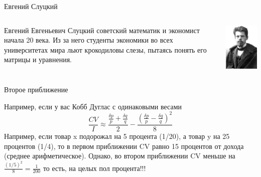 \documentclass{beamer}
\begin{document}
\begin{frame}{Евгений Слуцкий}
\begin{columns}
\begin{column}{0.5\textwidth}
   \alert{Евгений Евгеньевич Слуцкий} советский математик и экономист начала 20 века. Из за него студенты экономики во всех университетах мира льют крокодиловы слезы, пытаясь понять его матрицы и уравнения.
\end{column}
\begin{column}{0.5\textwidth}  %
    \begin{center}
     \includegraphics[width=1\textwidth]{eugen}
     \end{center}
\end{column}
\end{columns}
\end{frame}

\begin{frame}{Второе приближение}

Например, если у вас Кобб Дуглас с одинаковыми весами
$$ \frac{CV}{I} \approx \frac{\frac{\delta p}{p}+\frac{\delta q}{q}}{2} - \frac{(\frac{\delta p}{p}-\frac{\delta q}{q})^2}{8}$$
Например, если товар x подорожал на 5 процента (1/20), а товар y на 25 процентов (1/4), то в первом приближении CV равно 15 процентов от дохода (среднее арифметическое). Однако, во втором приближении CV меньше на $\frac{(1/5)^2}{8}=\frac{1}{200}$ то есть, на \alert{целых пол процента}!!!
\end{frame}
\end{document}
